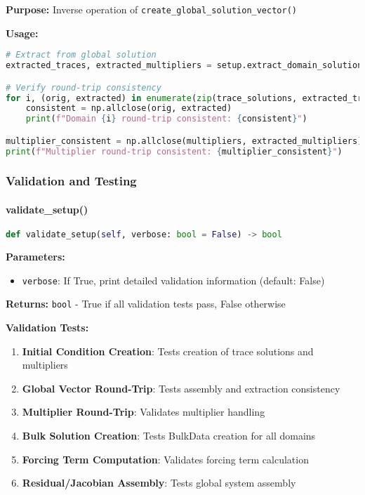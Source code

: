 \textbf{Purpose:} Inverse operation of \texttt{create\_global\_solution\_vector()}

\textbf{Usage:}
\begin{lstlisting}[language=Python, caption=Domain Solution Extraction Usage]
# Extract from global solution
extracted_traces, extracted_multipliers = setup.extract_domain_solutions(global_solution)

# Verify round-trip consistency
for i, (orig, extracted) in enumerate(zip(trace_solutions, extracted_traces)):
    consistent = np.allclose(orig, extracted)
    print(f"Domain {i} round-trip consistent: {consistent}")

multiplier_consistent = np.allclose(multipliers, extracted_multipliers)
print(f"Multiplier round-trip consistent: {multiplier_consistent}")
\end{lstlisting}

\subsubsection{Validation and Testing}

\paragraph{validate\_setup()}
\begin{lstlisting}[language=Python, caption=Validate Setup Method]
def validate_setup(self, verbose: bool = False) -> bool
\end{lstlisting}

\textbf{Parameters:}
\begin{itemize}
    \item \texttt{verbose}: If True, print detailed validation information (default: False)
\end{itemize}

\textbf{Returns:} \texttt{bool} - True if all validation tests pass, False otherwise

\textbf{Validation Tests:}
\begin{enumerate}
    \item \textbf{Initial Condition Creation}: Tests creation of trace solutions and multipliers
    \item \textbf{Global Vector Round-Trip}: Tests assembly and extraction consistency
    \item \textbf{Multiplier Round-Trip}: Validates multiplier handling
    \item \textbf{Bulk Solution Creation}: Tests BulkData creation for all domains
    \item \textbf{Forcing Term Computation}: Validates forcing term calculation
    \item \textbf{Residual/Jacobian Assembly}: Tests global system assembly
\end{enumerate}

